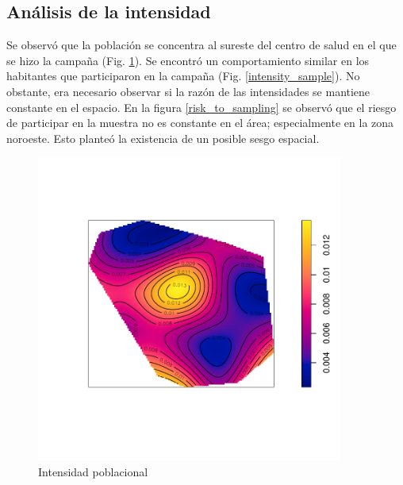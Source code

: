 \newpage
\subsection{Análisis de la intensidad}
Se observó que la población se concentra al sureste del centro de salud en el que se hizo la campaña (Fig. \ref{intensity_population}). Se encontró un comportamiento similar en los habitantes que participaron en la campaña (Fig. \ref{intensity_sample}). No obstante, era necesario observar si la razón de las intensidades se mantiene constante en el espacio. En la figura \ref{risk_to_sampling} se observó que el riesgo de participar en la muestra no es constante en el área; especialmente en la zona noroeste. Esto planteó la existencia  de un posible sesgo espacial.

\begin{figure}[h]
	\centering
	\includegraphics[width=0.9\textwidth]{graficos/intensity_population.pdf}
	\caption{Intensidad poblacional} \label{intensity_population}
\end{figure}

\newpage

